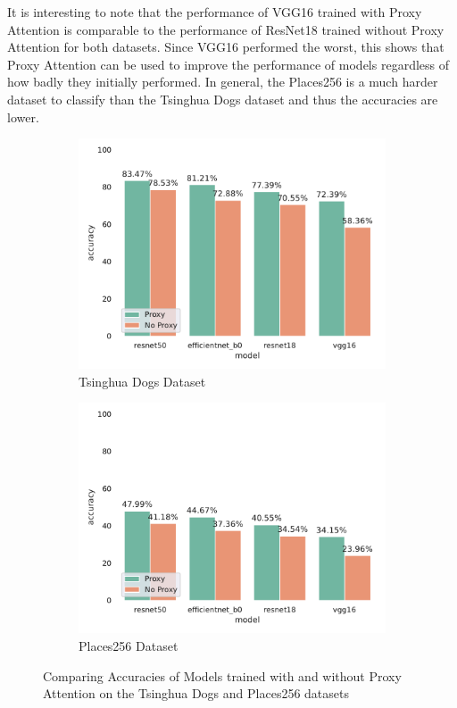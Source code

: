 \documentclass[a4paper,11pt,openright]{book}
\begin{document}
It is interesting to note that the performance of VGG16 trained with Proxy Attention is comparable to the performance of ResNet18 trained without Proxy Attention for both datasets. Since VGG16 performed the worst, this shows that Proxy Attention can be used to improve the performance of models regardless of how badly they initially performed.
In general, the Places256 is a much harder dataset to classify than the Tsinghua Dogs dataset and thus the accuracies are lower.

\begin{figure}[!htb]
    \begin{subfigure}[h]{.5\textwidth}
        \includegraphics[width=\linewidth, right]{results/tsing_results.pdf}
        \caption{Tsinghua Dogs Dataset}
    \end{subfigure}
    \begin{subfigure}[h]{.5\textwidth}
        \includegraphics[width=\linewidth, left]{results/places256_results.pdf}
        \caption{Places256 Dataset}
    \end{subfigure}
    \caption{Comparing Accuracies of Models trained with and without Proxy Attention on the Tsinghua Dogs and Places256 datasets}
    \label{fig:tsing_places256_results}
\end{figure}
\end{document}
